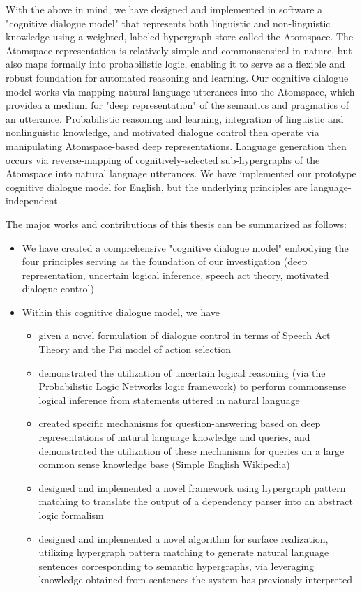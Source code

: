 \begin{englishabstract}
With the above in mind, we have designed and implemented in software a "cognitive dialogue model" that represents both linguistic and non-linguistic knowledge using a weighted, labeled hypergraph store called the Atomspace.  The Atomspace representation is relatively simple and commonsensical in nature, but also maps formally into probabilistic logic, enabling it to serve as a flexible and robust foundation for automated reasoning and learning.  Our cognitive dialogue  model works via  mapping natural language utterances into the Atomspace, which providea a medium for "deep representation" of the semantics and pragmatics of an utterance.  Probabilistic reasoning and learning, integration of linguistic and nonlinguistic knowledge, and motivated dialogue control then operate via manipulating Atomspace-based deep representations.  Language generation then occurs via reverse-mapping of cognitively-selected sub-hypergraphs of the Atomspace into natural language utterances.  We have implemented our prototype cognitive dialogue model for English, but the underlying principles are language-independent.

The major works and contributions of this thesis can be summarized as follows:


\begin{itemize}

\item We have created a comprehensive "cognitive dialogue model" embodying the four principles serving as the foundation of our investigation (deep representation, uncertain logical inference, speech act theory, motivated dialogue control)
\item Within this cognitive dialogue model, we have
\begin{itemize}
\item given a novel formulation of dialogue control in terms of Speech Act Theory and the Psi model of action selection
\item demonstrated the utilization of uncertain logical reasoning (via the Probabilistic Logic Networks logic framework) to perform commonsense logical inference from statements uttered in natural language
\item created specific  mechanisms for question-answering based on deep representations of natural language knowledge and queries, and demonstrated the utilization of these mechanisms for queries on a large common sense knowledge base (Simple English Wikipedia)
\item designed and implemented a novel framework using hypergraph pattern matching to translate the output of a dependency parser into an abstract logic formalism
\item designed and implemented a novel algorithm for surface realization, utilizing hypergraph pattern matching to generate natural language sentences corresponding to semantic hypergraphs, via leveraging knowledge obtained from sentences the system has previously interpreted
\end{itemize}


\end{itemize}
\end{englishabstract}
